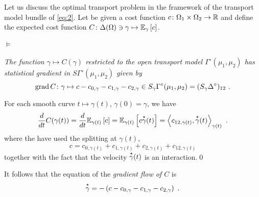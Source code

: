 \documentclass[runningheads]{llncs}
\begin{document}
Let us discuss the optimal transport problem in the framework of the transport model bundle of  \cref{eq:2}. Let be given a cost function $c \colon \Omega_1 \times \Omega_2 \to \mathbb R$ and define the expected cost function $C \colon \Delta(\Omega) \ni \gamma \mapsto {\operatorname{\mathbb E}}_{\gamma}\left[c\right]$.

\paragraph{$\bm \models$}  \emph{The function $\gamma \mapsto C(\gamma)$ restricted to the open transport model $\Gamma^\circ(\mu_1,\mu_2)$ has statistical gradient in $S\Gamma^\circ(\mu_1,\mu_2)$ given by
%
\begin{equation}\label{eq:gradient}
 \operatorname{grad} C \colon \gamma \mapsto c - c_{0,\gamma} - c_{1,\gamma} - c_{2,\gamma} \in S_\gamma\Gamma^\circ(\mu_1,\mu_2) = (S_\gamma \Delta^\circ)_{12} \ . 
\end{equation}}

For each smooth curve $t \mapsto \gamma(t)$, $\gamma(0) = \gamma$, we have 
\begin{equation*}
  \derivby t C(\gamma(t)) = \derivby t \expectat {\gamma(t)} c = \expectat {\gamma(t)} {c \velocity \gamma (t)} = \scalarat {\gamma(t)} {c_{12,\gamma(t)}} {\velocity \gamma(t)} \ .
\end{equation*}
where the have used the splitting at $\gamma(t)$,
\begin{equation*}
  c = c_{0,\gamma(t)} + c_{1,\gamma(t)} + c_{2,\gamma(t)} + c_{12,\gamma(t)}
\end{equation*}
together with the fact that the velocity $\overset{\star}{\gamma}(t)$ is an interaction.\qed

It follows that the equation of the \emph{gradient flow of $C$} is
%
\begin{equation*}
  \overset{\star}{\gamma} = - \left(c - c_{0,\gamma} - c_{1,\gamma} - c_{2,\gamma}\right) \ .
\end{equation*}
\end{document}
